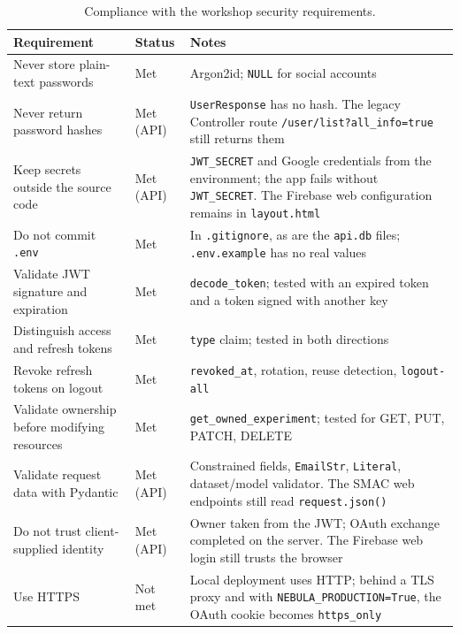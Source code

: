 \documentclass[9pt,a4paper,twocolumn]{article}
\begin{document}
\begin{table}[H]
\centering
\small
\begin{tabularx}{\columnwidth}{X l X}
\hline
\textbf{Requirement} & \textbf{Status} & \textbf{Notes} \\
\hline
Never store plain-text passwords & Met & Argon2id; \texttt{NULL} for social accounts \\
Never return password hashes & Met (API) & \texttt{UserResponse} has no hash. The legacy Controller route \texttt{/user/list?all\_info=true} still returns them \\
Keep secrets outside the source code & Met (API) & \texttt{JWT\_SECRET} and Google credentials from the environment; the app fails without \texttt{JWT\_SECRET}. The Firebase web configuration remains in \texttt{layout.html} \\
Do not commit \texttt{.env} & Met & In \texttt{.gitignore}, as are the \texttt{api.db} files; \texttt{.env.example} has no real values \\
Validate JWT signature and expiration & Met & \texttt{decode\_token}; tested with an expired token and a token signed with another key \\
Distinguish access and refresh tokens & Met & \texttt{type} claim; tested in both directions \\
Revoke refresh tokens on logout & Met & \texttt{revoked\_at}, rotation, reuse detection, \texttt{logout-all} \\
Validate ownership before modifying resources & Met & \texttt{get\_owned\_experiment}; tested for GET, PUT, PATCH, DELETE \\
Validate request data with Pydantic & Met (API) & Constrained fields, \texttt{EmailStr}, \texttt{Literal}, dataset/model validator. The SMAC web endpoints still read \texttt{request.json()} \\
Do not trust client-supplied identity & Met (API) & Owner taken from the JWT; OAuth exchange completed on the server. The Firebase web login still trusts the browser \\
Use HTTPS & Not met & Local deployment uses HTTP; behind a TLS proxy and with \texttt{NEBULA\_PRODUCTION=True}, the OAuth cookie becomes \texttt{https\_only} \\
\hline
\end{tabularx}
\caption{Compliance with the workshop security requirements.}
\label{tab:security}
\end{table}
\end{document}
